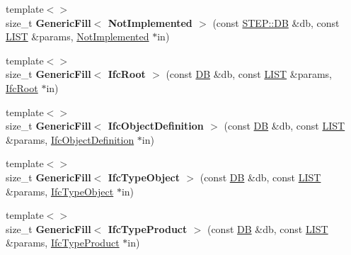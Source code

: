 \begin{DoxyCompactItemize}
\item 
\hypertarget{namespace_assimp_1_1_s_t_e_p_acf8b95247cce222325c4cfc8d3630e51}{{\footnotesize template$<$$>$ }\\size\+\_\+t {\bfseries Generic\+Fill$<$ Not\+Implemented $>$} (const \hyperlink{class_assimp_1_1_s_t_e_p_1_1_d_b}{S\+T\+E\+P\+::\+D\+B} \&db, const \hyperlink{class_assimp_1_1_s_t_e_p_1_1_e_x_p_r_e_s_s_1_1_l_i_s_t}{L\+I\+S\+T} \&params, \hyperlink{struct_assimp_1_1_i_f_c_1_1_not_implemented}{Not\+Implemented} $\ast$in)}\label{namespace_assimp_1_1_s_t_e_p_acf8b95247cce222325c4cfc8d3630e51}

\item 
\hypertarget{namespace_assimp_1_1_s_t_e_p_a1eeb77f12132c5ce54d962d28cb0962f}{{\footnotesize template$<$$>$ }\\size\+\_\+t {\bfseries Generic\+Fill$<$ Ifc\+Root $>$} (const \hyperlink{class_assimp_1_1_s_t_e_p_1_1_d_b}{D\+B} \&db, const \hyperlink{class_assimp_1_1_s_t_e_p_1_1_e_x_p_r_e_s_s_1_1_l_i_s_t}{L\+I\+S\+T} \&params, \hyperlink{struct_assimp_1_1_i_f_c_1_1_ifc_root}{Ifc\+Root} $\ast$in)}\label{namespace_assimp_1_1_s_t_e_p_a1eeb77f12132c5ce54d962d28cb0962f}

\item 
\hypertarget{namespace_assimp_1_1_s_t_e_p_ac4a3b38b943e756b8fcea8dbb4dabd46}{{\footnotesize template$<$$>$ }\\size\+\_\+t {\bfseries Generic\+Fill$<$ Ifc\+Object\+Definition $>$} (const \hyperlink{class_assimp_1_1_s_t_e_p_1_1_d_b}{D\+B} \&db, const \hyperlink{class_assimp_1_1_s_t_e_p_1_1_e_x_p_r_e_s_s_1_1_l_i_s_t}{L\+I\+S\+T} \&params, \hyperlink{struct_assimp_1_1_i_f_c_1_1_ifc_object_definition}{Ifc\+Object\+Definition} $\ast$in)}\label{namespace_assimp_1_1_s_t_e_p_ac4a3b38b943e756b8fcea8dbb4dabd46}

\item 
\hypertarget{namespace_assimp_1_1_s_t_e_p_adb0992d8f35ba0ad4cf29b6a6ec25773}{{\footnotesize template$<$$>$ }\\size\+\_\+t {\bfseries Generic\+Fill$<$ Ifc\+Type\+Object $>$} (const \hyperlink{class_assimp_1_1_s_t_e_p_1_1_d_b}{D\+B} \&db, const \hyperlink{class_assimp_1_1_s_t_e_p_1_1_e_x_p_r_e_s_s_1_1_l_i_s_t}{L\+I\+S\+T} \&params, \hyperlink{struct_assimp_1_1_i_f_c_1_1_ifc_type_object}{Ifc\+Type\+Object} $\ast$in)}\label{namespace_assimp_1_1_s_t_e_p_adb0992d8f35ba0ad4cf29b6a6ec25773}

\item 
\hypertarget{namespace_assimp_1_1_s_t_e_p_a51ee5d8afee80d1b331455db8f538d0d}{{\footnotesize template$<$$>$ }\\size\+\_\+t {\bfseries Generic\+Fill$<$ Ifc\+Type\+Product $>$} (const \hyperlink{class_assimp_1_1_s_t_e_p_1_1_d_b}{D\+B} \&db, const \hyperlink{class_assimp_1_1_s_t_e_p_1_1_e_x_p_r_e_s_s_1_1_l_i_s_t}{L\+I\+S\+T} \&params, \hyperlink{struct_assimp_1_1_i_f_c_1_1_ifc_type_product}{Ifc\+Type\+Product} $\ast$in)}\label{namespace_assimp_1_1_s_t_e_p_a51ee5d8afee80d1b331455db8f538d0d}


\end{DoxyCompactItemize}
